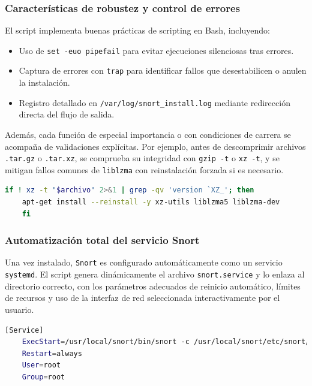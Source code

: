 \documentclass[11pt,a4paper,twoside]{report}
\begin{document}
\subsubsection{Características de robustez y control de errores}

El script implementa buenas prácticas de scripting en Bash, incluyendo:

\begin{itemize}
	\item Uso de \texttt{set -euo pipefail} para evitar ejecuciones silenciosas tras errores.
	\item Captura de errores con \texttt{trap} para identificar fallos que desestabilicen o anulen la instalación.
	\item Registro detallado en \texttt{/var/log/snort\_install.log} mediante redirección directa del flujo de salida.
\end{itemize}

Además, cada función de especial importancia o con condiciones de carrera se acompaña de validaciones explícitas. Por ejemplo, antes de descomprimir archivos \texttt{.tar.gz} o \texttt{.tar.xz}, se comprueba su integridad con \texttt{gzip -t} o \texttt{xz -t}, y se mitigan fallos comunes de \texttt{liblzma} con reinstalación forzada si es necesario.

\begin{lstlisting}[language=bash, caption={Validación e instalación segura de paquetes .xz}, label=lst:xz]
	if ! xz -t "$archivo" 2>&1 | grep -qv 'version `XZ_'; then
	apt-get install --reinstall -y xz-utils liblzma5 liblzma-dev
	fi
\end{lstlisting}

\subsubsection{Automatización total del servicio Snort}

Una vez instalado, \texttt{Snort} es configurado automáticamente como un servicio \texttt{systemd}. El script genera dinámicamente el archivo \texttt{snort.service} y lo enlaza al directorio correcto, con los parámetros adecuados de reinicio automático, límites de recursos y uso de la interfaz de red seleccionada interactivamente por el usuario.

\begin{lstlisting}[language=bash, caption={Sección relevante del systemd generado}, label=lst:systemd]
	[Service]
	ExecStart=/usr/local/snort/bin/snort -c /usr/local/snort/etc/snort/snort.lua -i eth0 -A alert_fast
	Restart=always
	User=root
	Group=root
\end{lstlisting}
\end{document}
